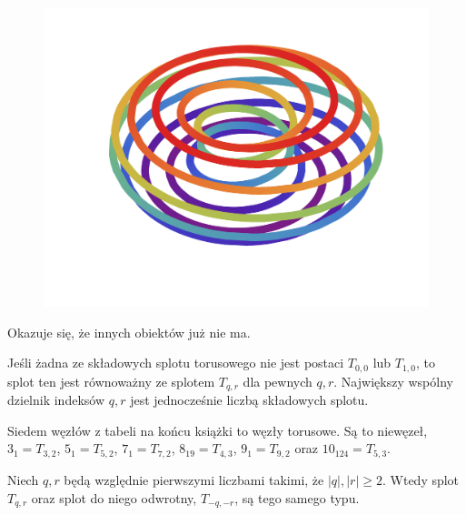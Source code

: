 \begin{figure}[H]
\begin{minipage}[b]{.3\linewidth}
        \centering
        \includegraphics[width=\linewidth]{../data/torus-p11-q2.pdf}
    \end{minipage}
\end{figure}

Okazuje się, że innych obiektów już nie ma.

\begin{proposition}
    Jeśli żadna ze składowych splotu torusowego nie jest postaci $T_{0, 0}$ lub $T_{1, 0}$, to splot ten jest równoważny ze splotem $T_{q, r}$ dla pewnych $q, r$.
    Największy wspólny dzielnik indeksów $q, r$ jest jednocześnie liczbą składowych splotu.
\end{proposition}


Siedem węzłów z tabeli na końcu książki to węzły torusowe.
Są to niewęzeł, $3_1 = T_{3,2}$, $5_1 = T_{5,2}$, $7_1 = T_{7,2}$, $8_{19} = T_{4,3}$, $9_1 = T_{9,2}$ oraz $10_{124} = T_{5, 3}$.

\begin{proposition}
    Niech $q, r$ będą względnie pierwszymi liczbami takimi, że $|q|, |r| \ge 2$.
    Wtedy splot $T_{q,r}$ oraz splot do niego odwrotny, $T_{-q, -r}$, są tego samego typu.
\end{proposition}

